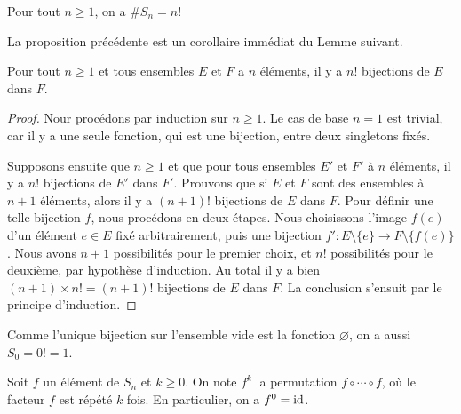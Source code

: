\documentclass[french,course,oneside,theoremnosection]{lecture}
\begin{document}
\begin{proposition}
Pour tout $n\geq 1$, on a $\# S_n=n!$
\end{proposition}
La proposition précédente est un corollaire immédiat du Lemme suivant.
\begin{lemma}
Pour tout $n \geq 1$ et tous ensembles $E$ et $F$ a $n$ éléments, il y a $n!$ bijections de $E$ dans $F$. 
\end{lemma}
\begin{proof}
Nour procédons par induction sur $n\geq 1$. Le cas de base $n=1$ est trivial, car il y a une seule fonction, qui est une bijection, entre deux singletons fixés.

Supposons ensuite que $n\geq 1$ et que pour tous ensembles $E'$ et $F'$ à $n$ éléments, il y a $n!$ bijections de $E'$ dans $F'$. Prouvons que si $E$ et $F$ sont des ensembles à $n+1$ éléments, alors il y a $(n+1)!$ bijections de $E$ dans $F$. Pour définir une telle bijection $f$, nous procédons en deux étapes. Nous choisissons l'image $f(e)$ d'un élément $e\in E$ fixé arbitrairement, puis une bijection $f'\colon E\setminus\{e\} \to F\setminus \{f(e)\}$. Nous avons $n+1$ possibilités pour le premier choix, et $n!$ possibilités pour le deuxième, par hypothèse d'induction. Au total il y a bien $(n+1) \times n! = (n+1)!$ bijections de $E$ dans $F$. La conclusion s'ensuit par le principe d'induction.

\end{proof}

\begin{remark}
Comme l'unique bijection sur l'ensemble vide est la fonction $\varnothing$, on a aussi $S_0=0!=1$.
\end{remark}

\begin{notation}
Soit $f$ un élément de $S_n$ et $k\geq 0$. On note $f^k$ la permutation $f\circ \cdots \circ f$, où le facteur $f$ est répété  $k$ fois. En particulier, on a $f^0=\operatorname{id}$.
\end{notation}
\end{document}

